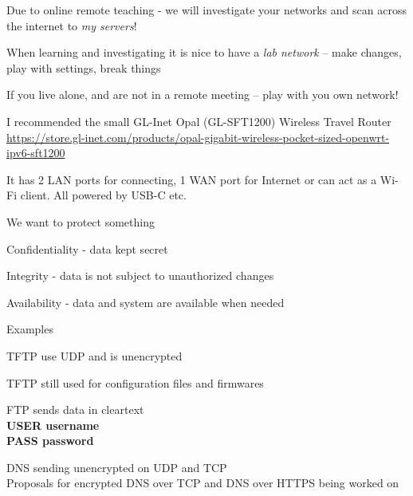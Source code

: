 \documentclass[Screen16to9,17pt]{foils}
\begin{document}
Due to online remote teaching - we will investigate your networks and scan across the internet to \emph{my servers}!



\begin{list2}
\item When learning and investigating it is nice to have a \emph{lab network} -- make changes, play with settings, break things
\item If you live alone, and are not in a remote meeting -- play with you own network!
\item I recommended the small GL-Inet Opal (GL-SFT1200) Wireless Travel Router\\
\url{https://store.gl-inet.com/products/opal-gigabit-wireless-pocket-sized-openwrt-ipv6-sft1200}
\item It has 2 LAN ports for connecting, 1 WAN port for Internet or can act as a Wi-Fi client. All powered by USB-C etc.
\end{list2}



\begin{list1}
\item We want to protect something
\item Confidentiality - data kept secret
\item Integrity - data is not subject to unauthorized changes
\item Availability - data and system are available when needed
\end{list1}


Examples
\begin{list2}
\item TFTP use UDP and is unencrypted
\item TFTP still used for configuration files and firmwares
\item FTP sends data in cleartext\\
{\bfseries USER username}\\
{\bfseries PASS password}
\item DNS sending unencrypted on UDP and TCP\\
Proposals for encrypted DNS over TCP and DNS over HTTPS being worked on
\end{list2}
\end{document}
